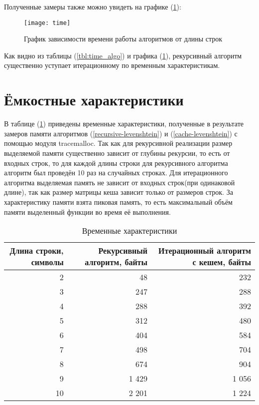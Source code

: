 Полученные замеры также можно увидеть на графике (\ref{fig:time_graph}):

\begin{figure}
	\centering
	\texttt{[image: time]}
	\caption{График зависимости времени работы алгоритмов от длины строк}
	\label{fig:time_graph}
\end{figure}

Как видно из таблицы (\ref{tbl:time_algo}) и графика (\ref{fig:time_graph}), рекурсивный алгоритм существенно уступает итерационному по временным характеристикам.

\pagebreak

\section{Ёмкостные характеристики}

В таблице (\ref{tbl:mem_algo}) приведены временные характеристики, полученные в результате замеров памяти алгоритмов (\ref{recursive-levenshtein}) и (\ref{cache-levenshtein}) с помощью модуля tracemalloc. Так как для рекурсивной реализации размер выделяемой памяти существенно зависит от глубины рекурсии, то есть от входных строк, то для каждой длины строки для рекурсивного алгоритма алгоритм был проведён 10 раз на случайных строках. Для итерационного алгоритма выделяемая память не зависит от входных строк(при одинаковой длине), так как размер матрицы кеша зависит только от размеров строк. За характеристику памяти взята пиковая память, то есть максимальный объём памяти выделенный функции во время её выполнения.


\begin{table}[ht]
	\small
	\begin{center}
		\begin{threeparttable}
			\caption{Временные характеристики}
			\label{tbl:mem_algo}
			\begin{tabular}{|r|r|r|}
				\hline
				Длина строки, символы & Рекурсивный алгоритм, байты & Итерационный алгоритм с кешем, байты \\
				\hline
				2 & 48  & 232  \\
				\hline
				3 & 247  & 288  \\
				\hline
				4 & 288  & 392  \\
				\hline
				5 & 312  & 480  \\
				\hline
				6 & 404  & 584  \\
				\hline
				7 & 498  & 704  \\
				\hline
				8 & 674  & 904  \\
				\hline
				9 & 1 429  & 1 056  \\
				\hline
				10 & 2 201  & 1 224  \\
				\hline
			\end{tabular}	
		\end{threeparttable}
	\end{center}
\end{table}

